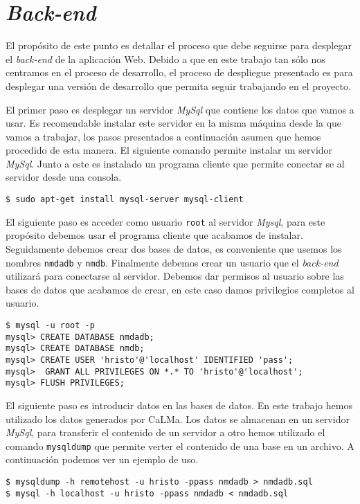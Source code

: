\section{\emph{Back-end}}
	\label{app_back}
	El propósito de este punto es detallar el proceso que debe seguirse para desplegar el \emph{back-end} de la aplicación Web. Debido a que en
	este trabajo tan sólo nos centramos en el proceso de desarrollo, el proceso de despliegue presentado es para desplegar una versión de
	desarrollo que permita seguir trabajando en el proyecto.
	\par
	El primer paso es desplegar un servidor \emph{MySql} que contiene los datos que vamos a usar. Es recomendable instalar este servidor en la misma
	máquina desde la que vamos a trabajar, los pasos presentados a continuación asumen que hemos procedido de esta manera. El siguiente comando
	permite instalar un servidor \emph{MySql}. Junto a este es instalado un programa cliente que permite conectar se al servidor desde una consola.
	\begin{lstlisting}[style=myBash]
$ sudo apt-get install mysql-server mysql-client
	\end{lstlisting}
	El siguiente paso es acceder como usuario \texttt{root} al servidor \emph{Mysql}, para este propósito debemos usar el programa cliente que acabamos
	de instalar. Seguidamente debemos crear dos bases de datos, es conveniente que usemos los nombres \texttt{nmdadb} y \texttt{nmdb}. Finalmente
	debemos crear un usuario que el \emph{back-end} utilizará para conectarse al servidor. Debemos dar permisos al usuario sobre las bases de
	datos que acabamos de crear, en este caso damos privilegios completos al usuario.
	\begin{lstlisting}[style=myBash]
$ mysql -u root -p
mysql> CREATE DATABASE nmdadb;
mysql> CREATE DATABASE nmdb;
mysql> CREATE USER 'hristo'@'localhost' IDENTIFIED 'pass';
mysql>  GRANT ALL PRIVILEGES ON *.* TO 'hristo'@'localhost';
mysql> FLUSH PRIVILEGES;
	\end{lstlisting}
	El siguiente paso es introducir datos en las bases de datos. En este trabajo hemos utilizado los datos generados por CaLMa. Los datos se
	almacenan en un servidor \emph{MySql}, para transferir el contenido de un servidor a otro hemos utilizado el comando \texttt{mysqldump} que permite
	verter el contenido de una base en un archivo. A continuación podemos ver un ejemplo de uso.
	\begin{lstlisting}[style=myBash]
$ mysqldump -h remotehost -u hristo -ppass nmdadb > nmdadb.sql
$ mysql -h localhost -u hristo -ppass nmdadb < nmdadb.sql
	\end{lstlisting}
